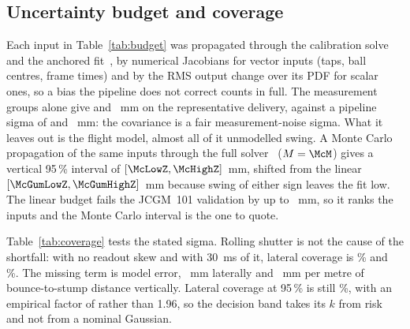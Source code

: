 \subsection{Uncertainty budget and coverage}
\label{sec:coverage}

\begin{table}[t]
\centering
\caption{Standard uncertainty (mm) at the stump plane by input group (JCGM 100), root sum of squares within
a group: a representative delivery (120~km/h, 6~m, 60~Hz) and the median over \BudDistN{} deliveries.}
\label{tab:budget}
\scriptsize
\setlength{\tabcolsep}{3pt}

\end{table}

\begin{table}[t]
\centering
\caption{Coverage (\%) of the stated uncertainty on \CovBFitted{} World~B deliveries, which add every input
of Table~\ref{tab:budget}. The model term is cross-validated over five held-out folds.}
\label{tab:coverage}
\scriptsize
\setlength{\tabcolsep}{2pt}

\end{table}

Each input in Table~\ref{tab:budget} was propagated through the calibration solve and the anchored
fit~\cite{jcgm100}, by numerical Jacobians for vector inputs (taps, ball centres, frame times) and by the RMS
output change over its PDF for scalar ones, so a bias the pipeline does not correct counts in full. The
measurement groups alone give \BudRepMeasY{} and \BudRepMeasZ~mm on the representative delivery, against a
pipeline sigma of \BudRepPipeSigmaY{} and \BudRepPipeSigmaZ~mm: the covariance is a fair measurement-noise
sigma. What it leaves out is the flight model, almost all of it unmodelled swing. A Monte Carlo propagation
of the same inputs through the full solver~\cite{jcgm101} ($M = \McM$) gives a vertical 95\,\% interval of
$[\McLowZ, \McHighZ]$~mm, shifted from the linear $[\McGumLowZ, \McGumHighZ]$~mm because swing of either sign
leaves the fit low. The linear budget fails the JCGM~101 validation by up to \McDHighZ~mm, so it ranks the
inputs and the Monte Carlo interval is the one to quote.

Table~\ref{tab:coverage} tests the stated sigma. Rolling shutter is not the cause of the shortfall: with no
readout skew and with 30~ms of it, lateral coverage is \SwRsZeroCovFitY\% and \SwRsThirtyCovFitY\%. The
missing term is model error, \ModYParamOne~mm laterally and \ModZParamOne~mm per metre of bounce-to-stump
distance vertically. Lateral coverage at 95\,\% is still \CovBFullYNinetyfive\%, with an empirical factor of
\KEmpFullYNinetyfive{} rather than 1.96, so the decision band takes its $k$ from risk and not from a nominal
Gaussian.
